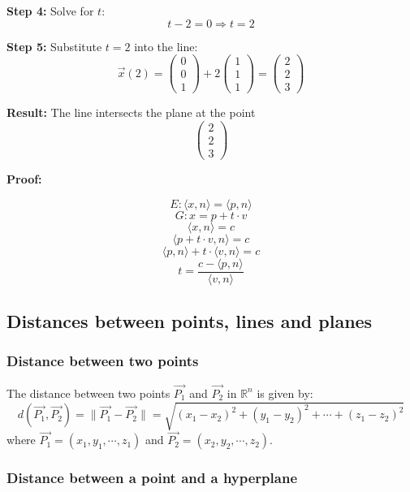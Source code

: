 \textbf{Step 4:} Solve for \( t \):
\[
	t - 2 = 0 \Rightarrow t = 2
\]

\textbf{Step 5:} Substitute \( t = 2 \) into the line:
\[
	\vec{x}(2) = \begin{pmatrix} 0 \\ 0 \\ 1 \end{pmatrix} + 2 \begin{pmatrix} 1 \\ 1 \\ 1 \end{pmatrix} =
	\begin{pmatrix} 2 \\ 2 \\ 3 \end{pmatrix}
\]

\textbf{Result:} The line intersects the plane at the point
\[
	\boxed{\begin{pmatrix} 2 \\ 2 \\ 3 \end{pmatrix}}
\]

\textbf{Proof:}

\[
	E: \langle x, n\rangle = \langle p, n \rangle
\]
\[
	G: x = p + t \cdot v
\]
\[
	\langle x, n \rangle = c
\]
\[
	\langle p + t \cdot v, n \rangle = c
\]
\[
	\langle p, n \rangle + t \cdot \langle v, n \rangle = c
\]
\[
	t = \frac{c - \langle p, n \rangle}{\langle v, n \rangle}
\]
\QED

\subsection{Distances between points, lines and planes}

\subsubsection*{Distance between two points}

The distance between two points \(\vec{P_1}\) and \(\vec{P_2}\) in \(\mathbb{R}^n\) is given by:
\[
	d(\vec{P_1}, \vec{P_2}) = \|\vec{P_1} - \vec{P_2}\| = \sqrt{(x_1 - x_2)^2 + (y_1 - y_2)^2 + \cdots + (z_1 - z_2)^2}
\]
where \(\vec{P_1} = (x_1, y_1, \cdots,z_1)\) and \(\vec{P_2} = (x_2, y_2, \cdots,z_2)\).

\subsubsection*{Distance between a point and a hyperplane}

